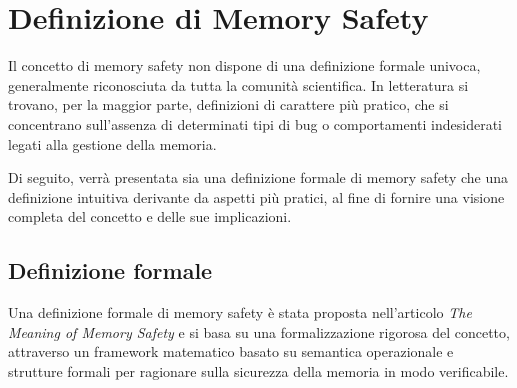 \section{Definizione di Memory Safety}
\label{sec:memory_safety}

Il concetto di memory safety non dispone di una definizione formale univoca,
generalmente riconosciuta da tutta la comunità scientifica. In letteratura si trovano,
per la maggior parte, definizioni di carattere più pratico, che si concentrano
sull'assenza di determinati tipi di bug o comportamenti indesiderati legati alla
gestione della memoria.

Di seguito, verrà presentata sia una definizione formale di memory safety che una
definizione intuitiva derivante da aspetti più pratici, al fine di fornire una
visione completa del concetto e delle sue implicazioni.

\subsection{Definizione formale}
\label{sec:formal_definition}

Una definizione formale di memory safety è stata proposta nell'articolo \textit{The
Meaning of Memory Safety}\cite{meaning_memory_safety} e si basa su una formalizzazione
rigorosa del concetto, attraverso un framework matematico basato su semantica
operazionale e strutture formali per ragionare sulla sicurezza della memoria in
modo verificabile.

